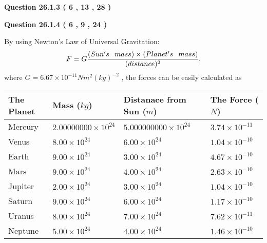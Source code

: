 \documentclass[12pt]{article}
\begin{document}
 
 
  
\vspace{0.2in}
  
{\textbf{\Large{Question
26.1.3 
 (           6 ,          13 ,          28 )
}}}
  
  
  
\vspace{0.2in}
  
{\textbf{\Large{Question
26.1.4 
 (           6 ,           9 ,          24 )
}}}
  
  
 
 

By using Newton's Law of Universal Gravitation:
\[
F=G \frac{(Sun's \hspace{0.1in} mass) \times (Planet's \hspace{0.1in} mass)} { (distance)^2},
\]
where
$ G= %
6.67 \times 10^{-11}N m^{2}(kg)^{-2}$ , the forces can be easily calculated as
 
\vspace{0.2in}
 
 
\begin{tabular}{|l|l|l|l|}
\hline
The Planet & Mass ($kg$) & Distanace from Sun ($m$) & The Force ($N$)\\
\hline
Mercury  &
           $ %
2.00000000 \times 10^{24} $   &
             $ %
5.000000000 \times 10^{24} $    & $ %
3.74 \times 10^{-11} $
\\  \hline
Venus    &
           $  %
8.00 \times 10^{24}  $     &
             $ %
6.00 \times 10^{24} $    & $ %
1.04 \times 10^{-10} $
\\  \hline
Earth    &
           $  %
9.00 \times 10^{24}  $     &
             $ %
3.00 \times 10^{24} $    & $ %
4.67 \times 10^{-10} $
\\   \hline
Mars     &
           $  %
9.00 \times 10^{24} $     &
             $ %
4.00 \times 10^{24} $    & $ %
2.63 \times 10^{-10} $
\\   \hline
Jupiter  &
           $  %
2.00 \times 10^{24} $    &
             $ %
3.00 \times 10^{24} $    & $ %
1.04 \times 10^{-10} $
\\  \hline
Saturn   &
           $  %
9.00 \times 10^{24} $    &
             $ %
6.00 \times 10^{24}  $    & $ %
1.17 \times 10^{-10} $
\\  \hline
Uranus   &
           $  %
8.00 \times 10^{24} $    &
             $ %
7.00 \times 10^{24} $    & $ %
7.62 \times 10^{-11} $
\\  \hline
Neptune  &
           $  %
5.00 \times 10^{24} $    &
             $ %
4.00 \times 10^{24} $    & $ %
1.46 \times 10^{-10} $
\\  \hline
 
\end{tabular}
 
\end{document}
